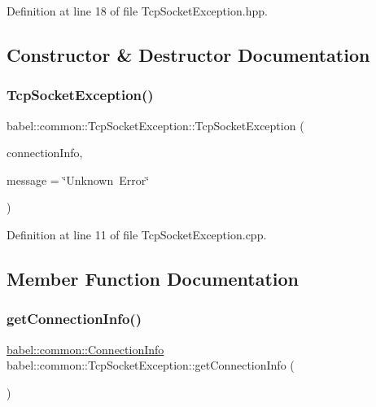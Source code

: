 Definition at line 18 of file Tcp\+Socket\+Exception.\+hpp.



\subsection{Constructor \& Destructor Documentation}
\mbox{\label{classbabel_1_1common_1_1_tcp_socket_exception_a6a24d1e9dc769afb2e4208f10f21f999}} 
\subsubsection{\texorpdfstring{Tcp\+Socket\+Exception()}{TcpSocketException()}}
{\footnotesize\ttfamily babel\+::common\+::\+Tcp\+Socket\+Exception\+::\+Tcp\+Socket\+Exception (\begin{DoxyParamCaption}\item[{\mbox{\hyperlink{classbabel_1_1common_1_1_connection_info}{Connection\+Info}}}]{connection\+Info,  }\item[{const std\+::string \&}]{message = {\ttfamily \char`\"{}Unknown~Error\char`\"{}} }\end{DoxyParamCaption})\hspace{0.3cm}{\ttfamily [explicit]}}



Definition at line 11 of file Tcp\+Socket\+Exception.\+cpp.



\subsection{Member Function Documentation}
\mbox{\label{classbabel_1_1common_1_1_tcp_socket_exception_ac218f5271e7aab52dbf370be65d1e6af}} 
\subsubsection{\texorpdfstring{get\+Connection\+Info()}{getConnectionInfo()}}
{\footnotesize\ttfamily \mbox{\hyperlink{classbabel_1_1common_1_1_connection_info}{babel\+::common\+::\+Connection\+Info}} babel\+::common\+::\+Tcp\+Socket\+Exception\+::get\+Connection\+Info (\begin{DoxyParamCaption}{ }\end{DoxyParamCaption})}



